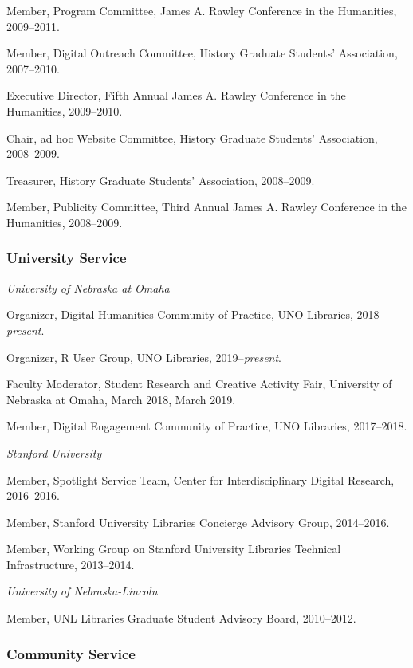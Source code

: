 Member, Program Committee, James A. Rawley Conference in the Humanities,
2009--2011.

Member, Digital Outreach Committee, History Graduate Students'
Association, 2007--2010.

Executive Director, Fifth Annual James A. Rawley Conference in the
Humanities, 2009--2010.

Chair, ad hoc Website Committee, History Graduate Students' Association,
2008--2009.

Treasurer, History Graduate Students' Association, 2008--2009.

Member, Publicity Committee, Third Annual James A. Rawley Conference in
the Humanities, 2008--2009.

\subsubsection{University Service}\label{university-service}

\emph{University of Nebraska at Omaha}

Organizer, Digital Humanities Community of Practice, UNO Libraries,
2018--\emph{present}.

Organizer, R User Group, UNO Libraries, 2019--\emph{present}.

Faculty Moderator, Student Research and Creative Activity Fair,
University of Nebraska at Omaha, March 2018, March 2019.

Member, Digital Engagement Community of Practice, UNO Libraries,
2017--2018.

\vspace{.4cm}

\emph{Stanford University}

Member, Spotlight Service Team, Center for Interdisciplinary Digital
Research, 2016--2016.

Member, Stanford University Libraries Concierge Advisory Group,
2014--2016.

Member, Working Group on Stanford University Libraries Technical
Infrastructure, 2013--2014.

\vspace{.4cm}

\emph{University of Nebraska-Lincoln}

Member, UNL Libraries Graduate Student Advisory Board, 2010--2012.

\subsubsection{Community Service}\label{community-service}

